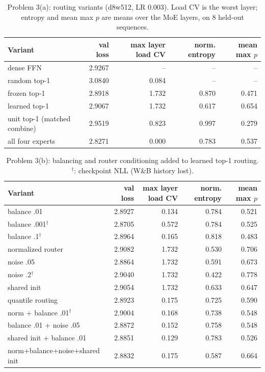 \begin{table}[H]\centering\small
\caption{Problem 3(a): routing variants (d8w512, LR 0.003). Load CV is the worst layer; entropy and mean max $p$ are means over the MoE layers, on 8 held-out sequences.}\label{tab:p3central}
\begin{tabular}{lrrrr}\toprule
Variant & val loss & max layer load CV & norm. entropy & mean max $p$ \\ \midrule
dense FFN & 2.9267 & -- & -- & -- \\
random top-1 & 3.0840 & 0.084 & -- & -- \\
frozen top-1 & 2.8918 & 1.732 & 0.870 & 0.471 \\
learned top-1 & 2.9067 & 1.732 & 0.617 & 0.654 \\
unit top-1 (matched combine) & 2.9519 & 0.823 & 0.997 & 0.279 \\
all four experts & 2.8271 & 0.000 & 0.783 & 0.537 \\
\bottomrule\end{tabular}
\end{table}
\begin{table}[H]\centering\small
\caption{Problem 3(b): balancing and router conditioning added to learned top-1 routing. $^\dagger$: checkpoint NLL (W\&B history lost).}\label{tab:p3tricks}
\begin{tabular}{lrrrr}\toprule
Variant & val loss & max layer load CV & norm. entropy & mean max $p$ \\ \midrule
balance .01 & 2.8927 & 0.134 & 0.784 & 0.521 \\
balance .001$^\dagger$ & 2.8705 & 0.572 & 0.784 & 0.525 \\
balance .1$^\dagger$ & 2.8964 & 0.165 & 0.818 & 0.483 \\
normalized router & 2.9082 & 1.732 & 0.530 & 0.706 \\
noise .05 & 2.8864 & 1.732 & 0.591 & 0.673 \\
noise .2$^\dagger$ & 2.9040 & 1.732 & 0.422 & 0.778 \\
shared init & 2.9054 & 1.732 & 0.633 & 0.647 \\
quantile routing & 2.8923 & 0.175 & 0.725 & 0.590 \\
norm + balance .01$^\dagger$ & 2.9004 & 0.168 & 0.738 & 0.548 \\
balance .01 + noise .05 & 2.8872 & 0.152 & 0.758 & 0.548 \\
shared init + balance .01 & 2.8851 & 0.129 & 0.783 & 0.526 \\
norm+balance+noise+shared init & 2.8832 & 0.175 & 0.587 & 0.664 \\
\bottomrule\end{tabular}
\end{table}
